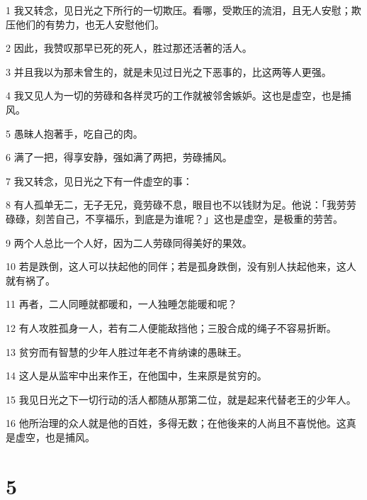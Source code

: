\par 1 我又转念，见日光之下所行的一切欺压。看哪，受欺压的流泪，且无人安慰；欺压他们的有势力，也无人安慰他们。
\par 2 因此，我赞叹那早已死的死人，胜过那还活著的活人。
\par 3 并且我以为那未曾生的，就是未见过日光之下恶事的，比这两等人更强。
\par 4 我又见人为一切的劳碌和各样灵巧的工作就被邻舍嫉妒。这也是虚空，也是捕风。
\par 5 愚昧人抱著手，吃自己的肉。
\par 6 满了一把，得享安静，强如满了两把，劳碌捕风。
\par 7 我又转念，见日光之下有一件虚空的事：
\par 8 有人孤单无二，无子无兄，竟劳碌不息，眼目也不以钱财为足。他说：「我劳劳碌碌，刻苦自己，不享福乐，到底是为谁呢？」这也是虚空，是极重的劳苦。
\par 9 两个人总比一个人好，因为二人劳碌同得美好的果效。
\par 10 若是跌倒，这人可以扶起他的同伴；若是孤身跌倒，没有别人扶起他来，这人就有祸了。
\par 11 再者，二人同睡就都暖和，一人独睡怎能暖和呢？
\par 12 有人攻胜孤身一人，若有二人便能敌挡他；三股合成的绳子不容易折断。
\par 13 贫穷而有智慧的少年人胜过年老不肯纳谏的愚昧王。
\par 14 这人是从监牢中出来作王，在他国中，生来原是贫穷的。
\par 15 我见日光之下一切行动的活人都随从那第二位，就是起来代替老王的少年人。
\par 16 他所治理的众人就是他的百姓，多得无数；在他後来的人尚且不喜悦他。这真是虚空，也是捕风。

\chapter{5}

